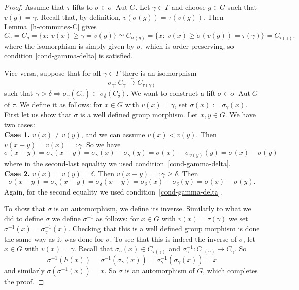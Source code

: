 \documentclass[10pt,a4paper]{amsart}
\DeclareMathOperator{\Aut}{Aut}
\newcommand{\lra}{\longrightarrow}
\newcommand{\oAut}{o\text{-}\Aut}
\newcommand{\ra}{\rightarrow}
\begin{document}
\begin{proof}
	Assume that $\tau$ lifts to $ \sigma\in\oAut G $. Let $\gamma\in\Gamma$ and choose $g\in G$ such that
	$v(g) = \gamma$. Recall that, by definition, $v(\sigma(g)) = \tau (v(g))$.
	Then Lemma~\ref{h-commutes-C} gives
	$$
	C_\gamma =C_g = \{x:\ v(x)\geq \gamma = v(g)\}\simeq C_{\sigma(g)} = \{x:\ v(x) \geq \tilde \sigma(v(g)) = \tau(\gamma)\} = C_{\tau(\gamma)}.
	$$
	where the isomorphism is simply given by $\sigma$, which is order preserving, so
	condition \eqref{cond-gamma-delta} is satisfied.
	
	Vice versa, suppose that for all $\gamma\in\Gamma$ there is an isomorphism
	$$
	\sigma_\gamma\colon C_\gamma \overset{\sim}{\lra} C_{\tau(\gamma)}
	$$
	such that $\gamma>\delta \Rightarrow \sigma_\gamma(C_\gamma)\subset \sigma_\delta(C_\delta)$.
	We want to construct a lift $\sigma \in \oAut G$ of $\tau$. We define it as follows:
	for $x\in G$ with $v(x) = \gamma$, set $\sigma(x):=\sigma_\gamma(x)$. First let us show that
	$\sigma$ is a well defined group morphism. Let $x,y \in G$. We have two cases:\\
	\textbf{Case 1.}
	$v(x)\neq v(y)$, and we can assume $v(x)<v(y)$.
	Then $v(x+y)=v(x) =:\gamma$. So we have 
	$$
	\sigma(x-y) = \sigma_\gamma (x-y) = \sigma_\gamma(x) - \sigma_\gamma(y) = \sigma(x) - \sigma_{v(y)}(y) = \sigma(x) - \sigma(y)$$
	where in the second-last equality we used condition~\eqref{cond-gamma-delta}.\\
	\textbf{Case 2.} $v(x) = v(y) = \delta$. Then $v(x+y) =: \gamma \geq \delta$. Then
	$$
	\sigma(x-y) = \sigma_\gamma(x-y) = \sigma_\delta(x-y) = \sigma_\delta(x) - \sigma_\delta(y) = \sigma(x) - \sigma(y).
	$$
	Again, for the second equality we used condition~\eqref{cond-gamma-delta}.
	
	To show that $\sigma$ is an automorphism, we define its inverse. Similarly to what we did
	to define $\sigma$ we define $\sigma^{-1}$ as follows: for $x\in G$ with 
	$v(x) = \tau(\gamma)$ we set $\sigma^{-1}(x) = \sigma_\gamma^{-1}(x) $.
	Checking that this is a
	well defined group morphism is done the same way as it was done for $\sigma$. To see that this is indeed the inverse of $ \sigma $, let $x\in G$ with 
	$v(x)=\gamma$.
	Recall that $\sigma_\gamma(x) \in C_{\tau(\gamma)}$ and $\sigma_\gamma^{-1}: C_{\tau(\gamma)}\ra C_\gamma$. So
	$$
	\sigma^{-1}(h(x)) = \sigma^{-1}(\sigma_\gamma(x)) = \sigma_\gamma^{-1}(\sigma_\gamma(x)) = x
	$$
	and similarly $\sigma(\sigma^{-1}(x)) = x$. So $\sigma$ is an automorphism of $G$, which completes the proof.
\end{proof}
\end{document}
